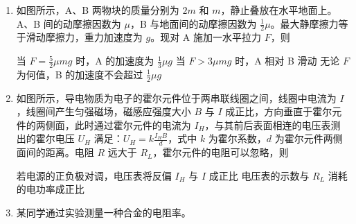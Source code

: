 \documentclass[\gkver]{gaokaozhenti}
\begin{document}
\begin{enumerate}

{提高交流电源的频率}
{将金属杯换为瓷杯}
{取走线圈中的铁芯}


\item
如图所示，A、B 两物块的质量分别为 $2m$ 和 $m$，静止叠放在水平地面上。A、B 间的动摩擦因数为 $\mu$，B 与地面间的动摩擦因数为 $\frac{1}{2}\mu$。最大静摩擦力等于滑动摩擦力，重力加速度为 $g$。现对 A 施加一水平拉力 $F$，则


{当 $F=\frac{5}{2}\mu mg$ 时，A 的加速度为 $\frac{1}{3}\mu g$}
{当 $F>3\mu mg$ 时，A 相对 B 滑动}
{无论 $F$ 为何值，B 的加速度不会超过 $\frac{1}{2}\mu g$}


\item
如图所示，导电物质为电子的霍尔元件位于两串联线圈之间，线圈中电流为 $I$，线圈间产生匀强磁场，磁感应强度大小 $B$ 与 $I$ 成正比，方向垂直于霍尔元件的两侧面，此时通过霍尔元件的电流为 $I_{H}$，与其前后表面相连的电压表测出的霍尔电压 $U_{H}$ 满足：$U_{H}=k\frac{I_{H}B}{d}$，式中 $k$ 为霍尔系数，$d$ 为霍尔元件两侧面间的距离。电阻 $R$ 远大于 $R_{L}$，霍尔元件的电阻可以忽略，则


{若电源的正负极对调，电压表将反偏}
{$I_{H}$ 与 $I$ 成正比}
{电压表的示数与 $R_{L}$ 消耗的电功率成正比}


\item
某同学通过实验测量一种合金的电阻率。


\end{enumerate}
\end{document}
